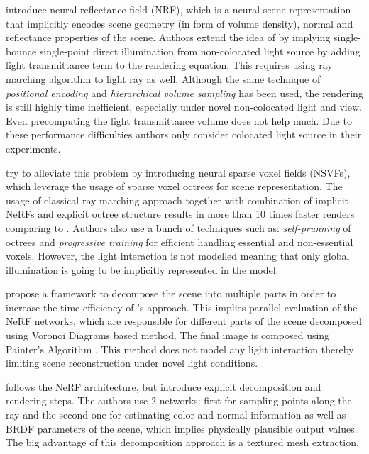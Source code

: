 \documentclass[english]{article}
\begin{document}
\cite{nrf2020} introduce neural reflectance field (NRF), which is a neural scene representation that implicitly encodes scene geometry (in form of volume density), normal and reflectance properties of the scene. Authors extend the idea of \cite{nerf2020mildenhall} by implying single-bounce single-point direct illumination from non-colocated light source by adding light transmittance term to the rendering equation. This requires using ray marching algorithm to light ray as well. Although the same technique of \textit{positional encoding} and \textit{hierarchical volume sampling} has been used, the rendering is still highly time inefficient, especially under novel non-colocated light and view. Even precomputing the light transmittance volume does not help much. Due to these performance difficulties authors only consider colocated light source in their experiments.

\cite{nsvf2020} try to alleviate this problem by introducing neural sparse voxel fields (NSVFs), which leverage the usage of sparse voxel octrees for scene representation. The usage of classical ray marching approach together with combination of implicit NeRFs and explicit octree structure results in more than 10 times faster renders comparing to \cite{nerf2020mildenhall}. Authors also use a bunch of techniques such as: \textit{self-prunning} of octrees and \textit{progressive training} for efficient handling essential and non-essential voxels. However, the light interaction is not modelled meaning that only global illumination is going to be implicitly represented in the model.

\cite{rebain2020derf} propose a framework to decompose the scene into multiple parts in order to increase the time efficiency of \cite{nerf2020mildenhall}'s approach. This implies parallel evaluation of the NeRF networks, which are responsible for different parts of the scene decomposed using Voronoi Diagrams \cite{aurenhammer1991voronoi} based method. The final image is composed using Painter's Algorithm \cite{Newell1972ANA}. This method does not model any light interaction thereby limiting scene reconstruction under novel light conditions.

\cite{boss2020nerd} follows the NeRF architecture, but introduce explicit decomposition and rendering steps. The authors use 2 networks: first for sampling points along the ray and the second one for estimating color and normal information as well as BRDF parameters of the scene, which implies physically plausible output values. The big advantage of this decomposition approach is a textured mesh extraction.
\end{document}

